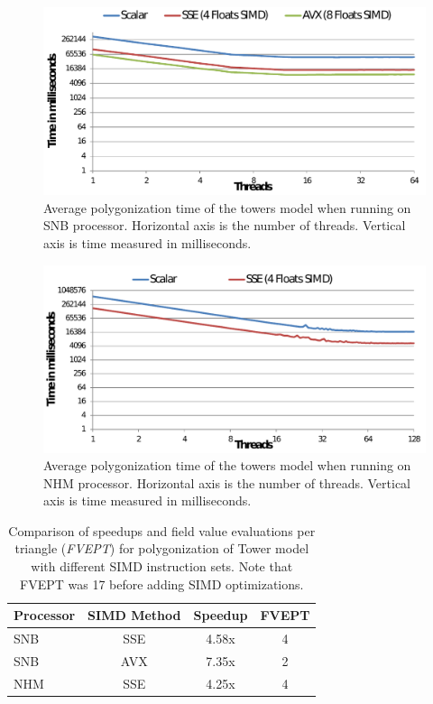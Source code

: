 \begin{figure}[H]
  \centering
  \includegraphics[width = 1.0\linewidth]{figures/cpupoly/Perf_SNB.pdf}
  \caption{\label{fig:PerfSNBTower}
  {Average polygonization time of the towers model when running on SNB processor. Horizontal axis is the number of threads. 
  Vertical axis is time measured in milliseconds.}
}
\end{figure}

\begin{figure}[htb]
  \centering
  \includegraphics[width = 1.0\linewidth]{figures/cpupoly/Perf_NHM.pdf}
  \caption{\label{fig:PerfXeonTower}
  {Average polygonization time of the towers model when running on NHM processor. Horizontal axis is the number of threads. 
  Vertical axis is time measured in milliseconds.}
}
\end{figure}

\begin{table}[H]
\begin{center}
\caption{\label{table:speedup}{Comparison of speedups and field value evaluations per triangle (\textit{FVEPT}) for polygonization of Tower model 
  with different SIMD instruction sets. Note that FVEPT was 17 before adding SIMD optimizations.}}
  \begin{tabular}{ | l | c | c | c | }
    \hline    
    Processor & SIMD Method & Speedup & FVEPT \\ \hline \hline    
    SNB & SSE & 4.58x & 4 \\ \hline
    SNB & AVX & 7.35x	& 2 \\ \hline
    NHM & SSE & 4.25x & 4 \\    
    \hline
  \end{tabular}
  	
\end{center}
\end{table}

